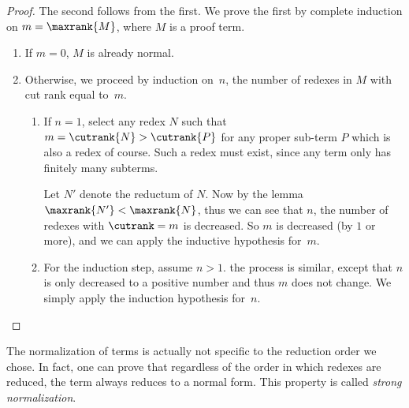 \documentclass[../../../include/open-logic-section]{subfiles}
\begin{document}
\begin{proof}
  The second follows from the first. We prove the first by complete
  induction on $m=\maxrank{M}$, where $M$ is a proof term.
  \begin{enumerate}

  \item If $m=0$, $M$ is already normal.
  \item
    Otherwise, we proceed by induction on~$n$, the number of
    redexes in $M$ with cut rank equal to~$m$.
    \begin{enumerate}
    \item If $n=1$, select any redex $N$ such that $m = \cutrank{N} >
      \cutrank{P}$ for any proper sub-term $P$ which is also a redex
      of course. Such a redex must exist, since any term only has
      finitely many subterms.

      Let $N'$ denote the reductum of $N$. Now by the lemma
      $\maxrank{N'} < \maxrank{N}$, thus we can see that $n$, the
      number of redexes with $\cutrank=m$ is decreased. So $m$ is
      decreased (by $1$ or more), and we can apply the inductive
      hypothesis for~$m$.
    \item For the induction step, assume $n>1$. the process is
      similar, except that $n$ is only decreased to a positive number
      and thus $m$ does not change. We simply apply the induction
      hypothesis for~$n$.
    \end{enumerate}
\end{enumerate}
\end{proof}

The normalization of terms is actually not specific to the reduction
order we chose. In fact, one can prove that regardless of the order in
which redexes are reduced, the term always reduces to a normal
form. This property is called \emph{strong normalization}.
\end{document}

